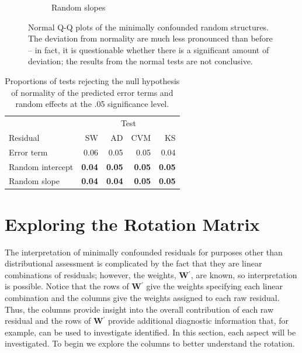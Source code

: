 \documentclass{article} %
\newcommand{\trans}{\ensuremath{^\prime}}
\begin{document}
\begin{figure}[htb]
\begin{subfigure}[b]{0.3\linewidth}
		\caption{Random slopes}
	  \end{subfigure}	
	\caption{\label{fig:lcqq} Normal Q-Q plots of the minimally confounded random structures. The deviation from normality are much less pronounced than before -- in fact, it is questionable whether there is a significant amount of deviation; the results from the normal tests are not conclusive.}
\end{figure}

\begin{table}[ht]
\caption{\label{tab:edf2} Proportions of tests rejecting the null hypothesis of normality of the predicted error terms and random effects at the .05 significance level. 
}
\begin{center}
\begin{tabular}{l rrrr} \hline
 & \multicolumn{4}{c}{Test} \\  \cline{2-5}
 Residual & SW &  AD & CVM & KS \\ \hline
Error term			& 0.06 & 0.05 & 0.05 & 0.04 \\
Random intercept 	& \bf 0.04 & \bf 0.05 & \bf 0.05 & \bf 0.05 \\
Random slope 		& \bf 0.04 & \bf 0.04 & \bf 0.05 & \bf 0.05 \\
   \hline
\end{tabular}
\end{center}
\end{table}

\section{Exploring the Rotation Matrix}

The interpretation of minimally confounded residuals for purposes other than distributional assessment is complicated by the fact that they are linear combinations of residuals; however, the weights, $\bm{W}\trans$, are known, so interpretation is possible. Notice that the rows of $\bm{W}\trans$ give the weights specifying each linear combination and the columns give the weights assigned to each raw residual. Thus, the columns provide insight into the overall contribution of each raw residual and the rows of $\bm{W}\trans$ provide additional diagnostic information that, for example, can be used to investigate identified. In this section, each aspect will be investigated. To begin we explore the columns to better understand the rotation.
\end{document}
